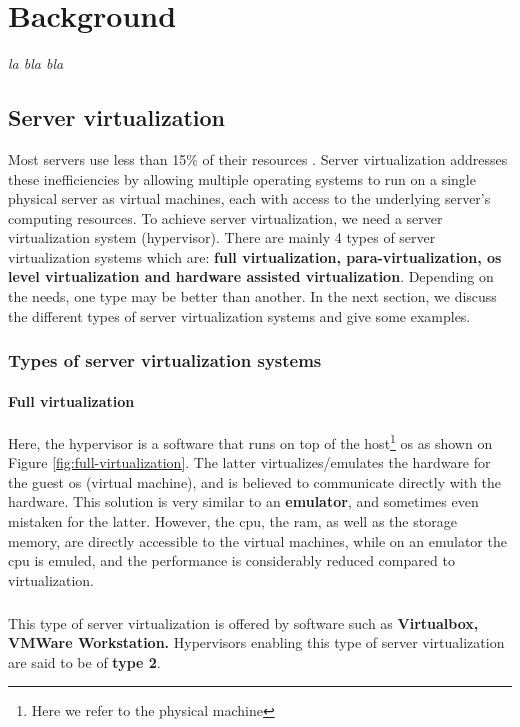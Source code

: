 \let\textcircled=\pgftextcircled
\chapter{Background}
\label{chap:background}

\textit{la bla bla }

\minitoc

\newpage    
\section{Server virtualization}
Most servers use less than 15\% of their resources \citep{serv1}. Server virtualization addresses these inefficiencies by allowing multiple operating systems to run on a single physical server as virtual machines, each with access to the underlying server's computing resources. To achieve server virtualization, we need a server virtualization system (hypervisor). There are mainly 4 types of server virtualization systems which are: \textbf{full virtualization, para-virtualization, \acrshort{os} level virtualization and hardware assisted virtualization}. Depending on the needs, one type may be better than another. In the next section, we discuss the different types of server virtualization systems and give some examples.

\subsection{Types of server virtualization systems}
\subsubsection{Full virtualization}
Here, the hypervisor is a software that runs on top of the host\footnote{Here we refer to the physical machine} \acrshort{os} as shown on Figure \ref{fig:full-virtualization}. The latter virtualizes/emulates the hardware for the guest \acrshort{os} (virtual machine), and is believed to communicate directly with the hardware. This solution is very similar to an \textbf{emulator}, and sometimes even mistaken for the latter. However, the \acrshort{cpu}, the \acrshort{ram}, as well as the storage memory, are directly accessible to the virtual machines, while on an emulator the \acrshort{cpu} is emuled, and the performance is considerably reduced compared to virtualization.
\paragraph{} This type of server virtualization is offered by software such as \textbf{Virtualbox, VMWare Workstation.} Hypervisors enabling this type of server virtualization are said to be of \textbf{type 2}.

